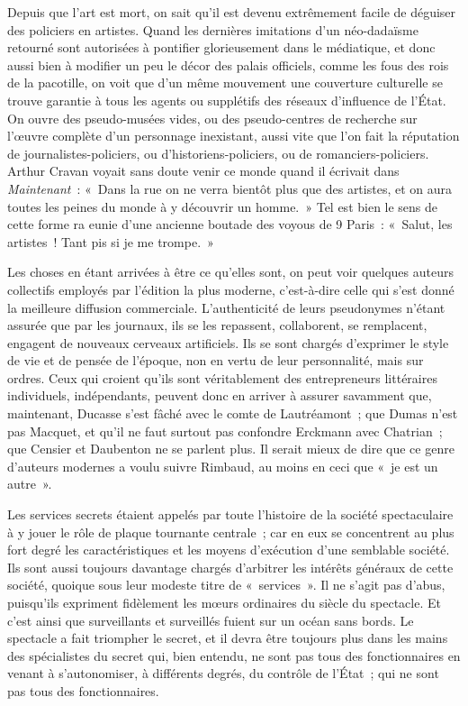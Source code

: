 \documentclass[french,twoside]{book} %
\begin{document}
Depuis que l’art est mort, on sait qu’il est devenu extrêmement facile de déguiser des policiers en artistes. Quand les dernières imitations d’un néo-dadaïsme retourné sont autorisées à pontifier glorieusement dans le médiatique, et donc aussi bien à modifier un peu le décor des palais officiels, comme les fous des rois de la pacotille, on voit que d’un même mouvement une couverture culturelle se trouve garantie à tous les agents ou supplétifs des réseaux d’influence de l’État. On ouvre des pseudo-musées vides, ou des pseudo-centres de recherche sur l’œuvre complète d’un personnage inexistant, aussi vite que l’on fait la réputation de journalistes-policiers, ou d’historiens-policiers, ou de romanciers-policiers. Arthur Cravan voyait sans doute venir ce monde quand il écrivait dans \emph{Maintenant} : « Dans la rue on ne verra bientôt plus que des artistes, et on aura toutes les peines du monde à y découvrir un homme. » Tel est bien le sens de cette forme ra eunie d’une ancienne boutade des voyous de 9 Paris : « Salut, les artistes ! Tant pis si je me trompe. »\par
Les choses en étant arrivées à être ce qu’elles sont, on peut voir quelques auteurs collectifs employés par l’édition la plus moderne, c’est-à-dire celle qui s’est donné la meilleure diffusion commerciale. L’authenticité de leurs pseudonymes n’étant assurée que par les journaux, ils se les repassent, collaborent, se remplacent, engagent de nouveaux cerveaux artificiels. Ils se sont chargés d’exprimer le style de vie et de pensée de l’époque, non en vertu de leur personnalité, mais sur ordres. Ceux qui croient qu’ils sont véritablement des entrepreneurs littéraires individuels, indépendants, peuvent donc en arriver à assurer savamment que, maintenant, Ducasse s’est fâché avec le comte de Lautréamont ; que Dumas n’est pas Macquet, et qu’il ne faut surtout pas confondre Erckmann avec Chatrian ; que Censier et Daubenton ne se parlent plus. Il serait mieux de dire que ce genre d’auteurs modernes a voulu suivre Rimbaud, au moins en ceci que « je est un autre ».\par
Les services secrets étaient appelés par toute l’histoire de la société spectaculaire à y jouer le rôle de plaque tournante centrale ; car en eux se concentrent au plus fort degré les caractéristiques et les moyens d’exécution d’une semblable société. Ils sont aussi toujours davantage chargés d’arbitrer les intérêts généraux de cette société, quoique sous leur modeste titre de « services ». Il ne s’agit pas d’abus, puisqu’ils expriment fidèlement les mœurs ordinaires du siècle du spectacle. Et c’est ainsi que surveillants et surveillés fuient sur un océan sans bords. Le spectacle a fait triompher le secret, et il devra être toujours plus dans les mains des spécialistes du secret qui, bien entendu, ne sont pas tous des fonctionnaires en venant à s’autonomiser, à différents degrés, du contrôle de l’État ; qui ne sont pas tous des fonctionnaires.\par
\end{document}
